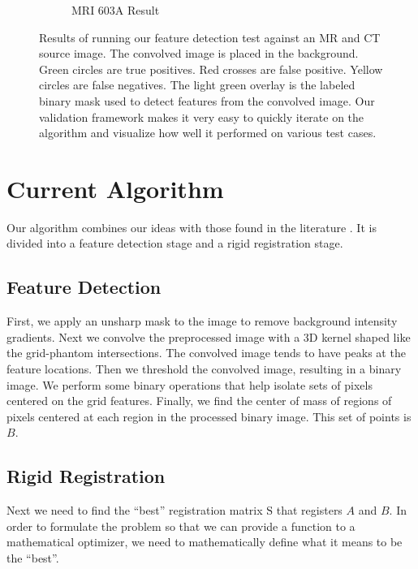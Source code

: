 \documentclass[12pt]{article}
\begin{document}
\begin{figure}
\begin{subfigure}[b]{0.48\textwidth}
        \caption{MRI 603A Result}
        \label{fig:testing-feature-detection_2}
    \end{subfigure}
    \caption{Results of running our feature detection test against an MR and CT source image.  The convolved image is placed in the background.  Green circles are true positives.  Red crosses are false positive.  Yellow circles are false negatives.  The light green overlay is the labeled binary mask used to detect features from the convolved image.  Our validation framework makes it very easy to quickly iterate on the algorithm and visualize how well it performed on various test cases.}
    \label{fig:feature-detection-run}
\end{figure}

\section{Current Algorithm}

Our algorithm combines our ideas with those found in the literature \cite{stanescu2010,baldwin2007}.  It is divided into a feature detection stage and a rigid registration stage.

\subsection{Feature Detection}

First, we apply an unsharp mask to the image to remove background intensity gradients.  Next we convolve the preprocessed image with a 3D kernel shaped like the grid-phantom intersections.  The convolved image tends to have peaks at the feature locations.  Then we threshold the convolved image, resulting in a binary image.  We perform some binary operations that help isolate sets of pixels centered on the grid features.  Finally, we find the center of mass of regions of pixels centered at each region in the processed binary image.  This set of points is $B$.

\subsection{Rigid Registration}

Next we need to find the ``best'' registration matrix $\textrm{S}$ that registers $A$ and $B$. In order to formulate the problem so that we can provide a function to a mathematical optimizer, we need to mathematically define what it means to be the ``best''.
\end{document}
